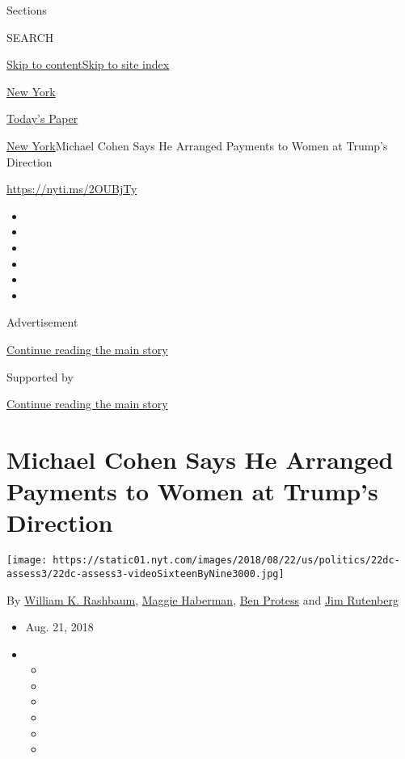 Sections

SEARCH

\protect\hyperlink{site-content}{Skip to
content}\protect\hyperlink{site-index}{Skip to site index}

\href{https://www.nytimes.com/section/nyregion}{New York}

\href{https://myaccount.nytimes.com/auth/login?response_type=cookie\&client_id=vi}{}

\href{https://www.nytimes.com/section/todayspaper}{Today's Paper}

\href{/section/nyregion}{New York}\textbar{}Michael Cohen Says He
Arranged Payments to Women at Trump's Direction

\url{https://nyti.ms/2OUBjTy}

\begin{itemize}
\item
\item
\item
\item
\item
\item
\end{itemize}

Advertisement

\protect\hyperlink{after-top}{Continue reading the main story}

Supported by

\protect\hyperlink{after-sponsor}{Continue reading the main story}

\hypertarget{michael-cohen-says-he-arranged-payments-to-women-at-trumps-direction}{%
\section{Michael Cohen Says He Arranged Payments to Women at Trump's
Direction}\label{michael-cohen-says-he-arranged-payments-to-women-at-trumps-direction}}

\texttt{[image: https://static01.nyt.com/images/2018/08/22/us/politics/22dc-assess3/22dc-assess3-videoSixteenByNine3000.jpg]}

By \href{http://www.nytimes.com/by/william-k-rashbaum}{William K.
Rashbaum}, \href{http://www.nytimes.com/by/maggie-haberman}{Maggie
Haberman}, \href{http://www.nytimes.com/by/ben-protess}{Ben Protess} and
\href{http://www.nytimes.com/by/jim-rutenberg}{Jim Rutenberg}

\begin{itemize}
\item
  Aug. 21, 2018
\item
  \begin{itemize}
  \item
  \item
  \item
  \item
  \item
  \item
  \end{itemize}
\end{itemize}

